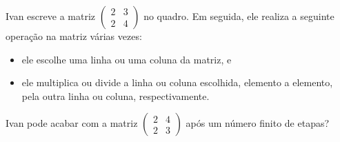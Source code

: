 Ivan escreve a matriz \(\begin{pmatrix} 2 & 3 \\ 2 & 4 \end{pmatrix}\) no quadro. Em seguida, ele realiza a seguinte operação na matriz várias vezes:
\begin{itemize}
    \item ele escolhe uma linha ou uma coluna da matriz, e
    \item ele multiplica ou divide a linha ou coluna escolhida, elemento a elemento, pela outra linha ou coluna, respectivamente.
\end{itemize}
Ivan pode acabar com a matriz \(\begin{pmatrix} 2 & 4 \\ 2 & 3 \end{pmatrix}\) após um número finito de etapas?

